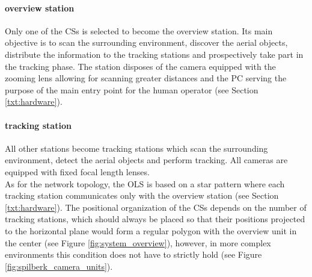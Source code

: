 \paragraph{overview station} Only one of the CSs is selected to become the overview station. Its main objective is to scan the surrounding environment, discover the aerial objects, distribute the information to the tracking stations and prospectively take part in the tracking phase. The station disposes of the camera equipped with the zooming lens allowing for scanning greater distances and the PC serving the purpose of the main entry point for the human operator (see Section \ref{txt:hardware}).

\paragraph{tracking station} All other stations become tracking stations which scan the surrounding environment, detect the aerial objects and perform tracking. All cameras are equipped with fixed focal length lenses. \\

As for the network topology, the OLS is based on a star pattern where each tracking station communicates only with the overview station (see Section \ref{txt:hardware}). The positional organization of the CSs depends on the number of tracking stations, which should always be placed so that their positions projected to the horizontal plane would form a regular polygon with the overview unit in the center (see Figure \ref{fig:system_overview}), however, in more complex environments this condition does not have to strictly hold (see Figure \ref{fig:spilberk_camera_units}).

